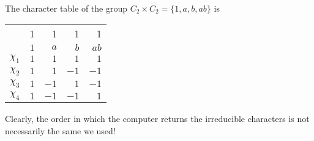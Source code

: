 \begin{example}
	The character table of the group $C_2\times C_2=\{1,a,b,ab\}$ is 
	\begin{center}
		\begin{tabular}{|c|rrrr|}
			\hline 
			& 1 & 1 & 1 & 1\tabularnewline
			& $1$ & $a$ & $b$ & $ab$\tabularnewline
			\hline 
			$\chi_{1}$ & $1$ & $1$ & $1$ & $1$\tabularnewline
			$\chi_{2}$ & $1$ & $1$ & $-1$ & $-1$\tabularnewline
			$\chi_{3}$ & $1$ & $-1$ & $1$ & $-1$\tabularnewline
			$\chi_{4}$ & $1$ & $-1$ & $-1$ & $1$\tabularnewline
			\hline
		\end{tabular}
	\end{center}



\end{example}

Clearly, the order in which the computer returns the irreducible characters is not necessarily the same we used! 

